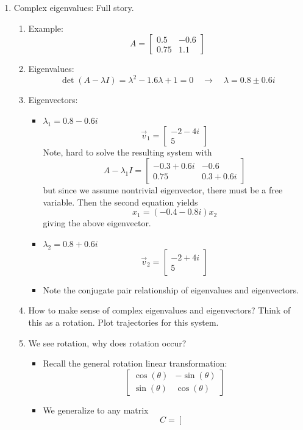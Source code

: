 \documentclass{article}
\begin{document}
\begin{enumerate}
\item Complex eigenvalues: Full story.
\begin{enumerate}
\item Example:
\[
A = \left[
\begin{array}{cc}
0.5 & -0.6 \\
0.75 & 1.1
\end{array}
\right]
\]
\item Eigenvalues:
\[
\det(A- \lambda I) = \lambda^2 - 1.6 \lambda +1 = 0 \quad \rightarrow \quad \lambda = 0.8 \pm 0.6i
\]
\item Eigenvectors:
\begin{itemize}
\item $\lambda_1 = 0.8-0.6i$
\[
\vec{v}_1 = \left[
\begin{array}{c}
-2-4i \\5
\end{array}
\right]
\]
Note, hard to solve the resulting system with
\[
A - \lambda_1 I = \left[
\begin{array}{cc}
-0.3+0.6i & -0.6 \\
0.75 & 0.3+0.6i
\end{array}
\right]
\]
but since we assume nontrivial eigenvector, there must be a free variable. Then the second equation yields 
\[
x_1 = (-0.4 - 0.8i) x_2
\]
giving the above eigenvector.
\item $\lambda_2 = 0.8+0.6i$
\[
\vec{v}_2 = \left[
\begin{array}{c}
-2+4i \\5
\end{array}
\right]
\]
\item Note the conjugate pair relationship of eigenvalues and eigenvectors.
\end{itemize}
\item How to make sense of complex eigenvalues and eigenvectors? Think of this as a rotation. Plot trajectories for this system.
\item We see rotation, why does rotation occur?
\begin{itemize}
\item Recall the general rotation linear transformation:
\[
\left[
\begin{array}{cc}
\cos(\theta) & -\sin(\theta) \\
\sin(\theta) & \cos(\theta)
\end{array}
\right]
\]
\item We generalize to any matrix
\[
C = \left[
\begin{array}{cc}

\end{array}\]
\end{itemize}
\end{enumerate}
\end{enumerate}
\end{document}
